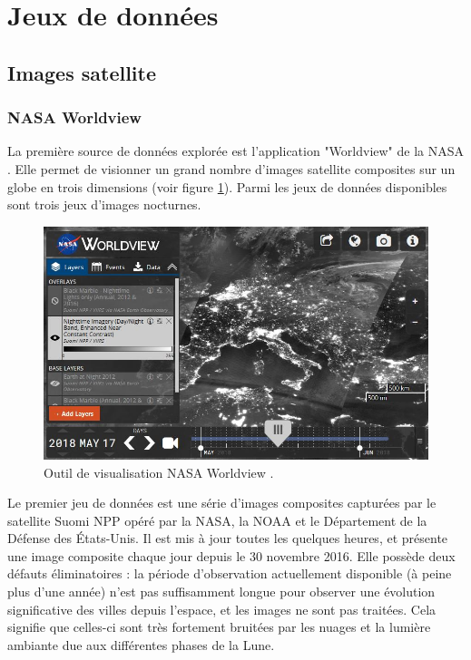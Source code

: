 \documentclass[a4paper, 11pt]{report}
\begin{document}
\section{Jeux de données}
\subsection{Images satellite}
\subsubsection{NASA Worldview}
La première source de données explorée est l'application "Worldview" de la NASA \cite{nasa-worldview}. Elle permet de visionner un grand nombre d'images satellite composites sur un globe en trois dimensions (voir figure \ref{nasa-worldview-screenshot}). Parmi les jeux de données disponibles sont trois jeux d'images nocturnes.

\begin{figure}[h]
	\centering
	\includegraphics[width=1.0\textwidth]{img/worldview.JPG}
	\caption{Outil de visualisation NASA Worldview \cite{nasa-worldview}.}
	\label{nasa-worldview-screenshot}
\end{figure}

Le premier jeu de données est une série d'images composites capturées par le satellite Suomi NPP opéré par la NASA, la NOAA et le Département de la Défense des États-Unis. Il est mis à jour toutes les quelques heures, et présente une image composite chaque jour depuis le 30 novembre 2016. Elle possède deux défauts éliminatoires : la période d'observation actuellement disponible (à peine plus d'une année) n'est pas suffisamment longue pour observer une évolution significative des villes depuis l'espace, et les images ne sont pas traitées. Cela signifie que celles-ci sont très fortement bruitées par les nuages et la lumière ambiante due aux différentes phases de la Lune.
\end{document}
